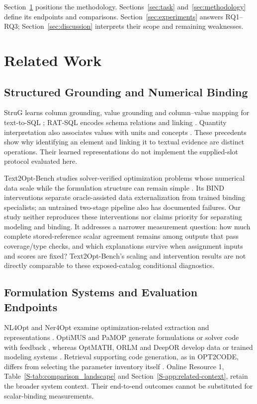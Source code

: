 \documentclass[pdflatex,iicol,sn-basic,Numbered]{sn-jnl}
\begin{document}
Section~\ref{sec:related_work} positions the methodology. Sections~\ref{sec:task} and~\ref{sec:methodology} define its endpoints and comparisons. Section~\ref{sec:experiments} answers RQ1--RQ3; Section~\ref{sec:discussion} interprets their scope and remaining weaknesses.

\section{Related Work}
\label{sec:related_work}
\subsection{Structured Grounding and Numerical Binding}
\label{subsec:rw_binding}
StruG learns column grounding, value grounding and column--value mapping for text-to-SQL \cite{deng2021strug}; RAT-SQL encodes schema relations and linking \cite{wang2020ratsql}. Quantity interpretation also associates values with units and concepts \cite{almasian2023cqe,roy2017udg}. These precedents show why identifying an element and linking it to textual evidence are distinct operations. Their learned representations do not implement the supplied-slot protocol evaluated here.

Text2Opt-Bench studies solver-verified optimization problems whose numerical data scale while the formulation structure can remain simple \cite{gao2026models}. Its BIND interventions separate oracle-assisted data externalization from trained binding specialists; an untrained two-stage pipeline also has documented failures. Our study neither reproduces these interventions nor claims priority for separating modeling and binding. It addresses a narrower measurement question: how much complete stored-reference scalar agreement remains among outputs that pass coverage/type checks, and which explanations survive when assignment inputs and scores are fixed? Text2Opt-Bench's scaling and intervention results are not directly comparable to these exposed-catalog conditional diagnostics.

\subsection{Formulation Systems and Evaluation Endpoints}
\label{subsec:rw_llm_generation}\label{subsec:rw_retrieval_memory}
NL4Opt and Ner4Opt examine optimization-related extraction and representations \cite{ramamonjison2023nl4opt,kadioglu2024ner4opt}. OptiMUS and PaMOP generate formulations or solver code with feedback \cite{ahmaditeshnizi2024optimus_icml,pan2025pamop}, whereas OptMATH, ORLM and DeepOR develop data or trained modeling systems \cite{lu2025optmath,huang2025orlm,xiao2026deepor}. Retrieval supporting code generation, as in OPT2CODE, differs from selecting the parameter inventory itself \cite{ahmed2025opt2code}. Online Resource 1, Table~\ref{S-tab:comparison_landscape} and Section~\ref{S-app:related-context}, retain the broader system context. Their end-to-end outcomes cannot be substituted for scalar-binding measurements.
\end{document}
